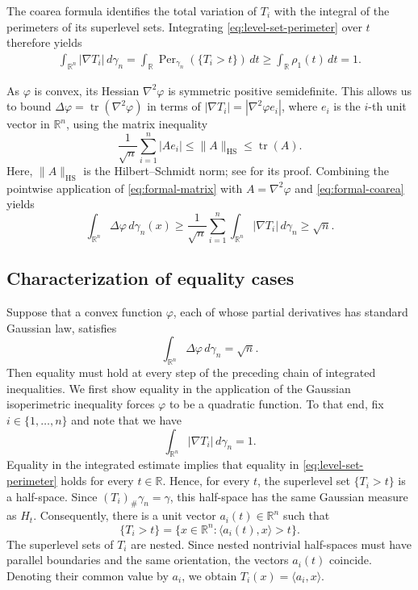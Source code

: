 \documentclass[11pt]{amsart}
\theoremstyle{definition}
\newcommand{\R}{\mathbb{R}}
\newcommand{\tr}{\operatorname{tr}}
\newcommand{\Perg}{\operatorname{Per}_{\gamma_n}}
\begin{document}
The coarea formula identifies the total variation of $T_i$ with the
integral of the perimeters of its superlevel sets. Integrating
\eqref{eq:level-set-perimeter} over $t$ therefore yields
\begin{align}
    \int_{\R^n}|\nabla T_i|\,d\gamma_n
    =
    \int_{\R}\Perg(\{T_i>t\})\,dt 
    \geq
    \int_{\R}\rho_1(t)\,dt
    =
    1.
    \label{eq:formal-coarea}
\end{align}

\medskip

As $\varphi$ is convex, its Hessian $\nabla^2\varphi$ is symmetric positive semidefinite. This allows us to bound $\Delta\varphi = \tr(\nabla^2 \varphi)$ in terms of $|\nabla T_i| = |\nabla^2 \varphi e_i|$, where $e_i$ is the $i$-th unit vector in $\R^n$, using the matrix inequality
\begin{equation}\label{eq:formal-matrix}
    \frac{1}{\sqrt n}\sum_{i=1}^n |Ae_i|
    \leq
    \|A\|_{\mathrm{HS}}
    \leq
    \tr(A).
\end{equation}
Here, $\|A\|_{\mathrm{HS}}$ is the Hilbert--Schmidt norm; see  for its proof. Combining the pointwise application of \eqref{eq:formal-matrix} with $A=\nabla^2\varphi$ and \eqref{eq:formal-coarea} yields
\[
\int_{\R^n}\Delta\varphi\,d\gamma_n(x) \ge \frac{1}{\sqrt n}\sum_{i=1}^n \int_{\R^n}|\nabla T_i|\,d\gamma_n
    \ge \sqrt{n}.
\]











\subsection{Characterization of equality cases}


Suppose that a convex function $\varphi$, each of whose partial derivatives has standard Gaussian law, satisfies
\begin{equation}\label{eq:laplacian-equality}
    \int_{\R^n}\Delta\varphi\,d\gamma_n
    =
    \sqrt n.
\end{equation}
Then equality must hold at every step of the preceding chain of
integrated inequalities. We first show equality in the application of the Gaussian isoperimetric inequality forces $\varphi$ to be a quadratic function. To that end, fix $i\in\{1,\ldots,n\}$ and note that we have
\[
    \int_{\R^n}|\nabla T_i|\,d\gamma_n=1.
\]
Equality in the integrated estimate implies
that equality in \eqref{eq:level-set-perimeter} holds for  every
$t\in\R$. Hence, for every $t$, the superlevel set
$\{T_i>t\}$ is a
half-space. Since $(T_i)_\#\gamma_n=\gamma$, this half-space has the
same Gaussian measure as $H_t$. 
Consequently, there is a unit vector $a_i(t)\in\R^n$ such that
\[
    \{T_i>t\}
    =
    \{x\in\R^n:\langle a_i(t),x\rangle>t\}.
\]
The superlevel sets of $T_i$ are nested. Since nested nontrivial
half-spaces must have parallel boundaries and the same orientation,
the vectors $a_i(t)$ coincide. Denoting their common value by $a_i$, we obtain
$
    T_i(x)=\langle a_i,x\rangle.
$
\end{document}
